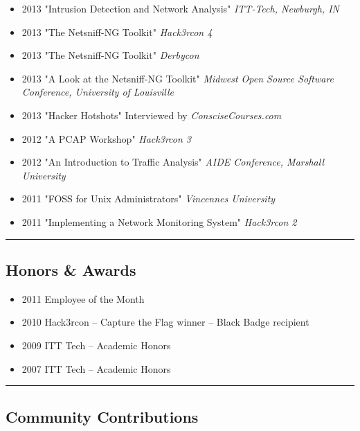 \documentclass[10pt,letterpaper]{article}
\begin{document}
\begin{itemize}
	\parskip=0.1em
	\item \textsc{2013} "Intrusion Detection and Network Analysis" \textit{ITT-Tech, Newburgh, IN}
	\item \textsc{2013} "The Netsniff-NG Toolkit" \textit{Hack3rcon 4}
	\item \textsc{2013} "The Netsniff-NG Toolkit" \textit{Derbycon}
	\item \textsc{2013} "A Look at the Netsniff-NG Toolkit" \textit{Midwest Open Source Software Conference, University of Louisville}
	\item \textsc{2013} "Hacker Hotshots" Interviewed by \textit{ConsciseCourses.com}
	\item \textsc{2012} "A PCAP Workshop" \textit{Hack3rcon 3}
	\item \textsc{2012} "An Introduction to Traffic Analysis" \textit{AIDE Conference, Marshall University}
	\item \textsc{2011} "FOSS for Unix Administrators" \textit{Vincennes University}
	\item \textsc{2011} "Implementing a Network Monitoring System" \textit{Hack3rcon 2}

\end{itemize}

\hrule
\vspace{-0.4em}
\subsection*{Honors \& Awards}

\begin{itemize}
	\parskip=0.1em

	\item \textsc{2011} Employee of the Month
	\item \textsc{2010} Hack3rcon – Capture the Flag winner – Black Badge recipient
	\item \textsc{2009} ITT Tech – Academic Honors
	\item \textsc{2007} ITT Tech – Academic Honors

\end{itemize}

\hrule
\vspace{-0.4em}
\subsection*{Community Contributions}
\end{document}
